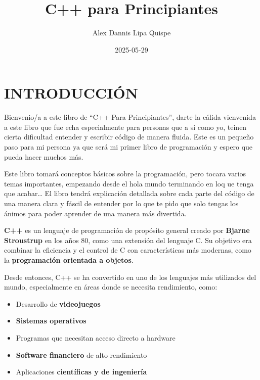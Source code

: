 \documentclass[
  11pt,
  a4paper,
  DIV=11,
  numbers=noendperiod]{scrreprt}
\title{C++ para Principiantes}
\author{Alex Dannis Lipa Quispe}
\date{2025-05-29}
\renewcommand*\contentsname{Table of contents}
\newcommand\contentsname{Table of contents}
\begin{document}
\maketitle

\renewcommand*\contentsname{Table of contents}
{
\hypersetup{linkcolor=}
\setcounter{tocdepth}{2}
\tableofcontents
}


\chapter{INTRODUCCIÓN}\label{introducciuxf3n}

Bienvenio/a a este libro de ``C++ Para Principiantes'', darte la cálida
vienvenida a este libro que fue echa especialmente para personas que a
si como yo, teinen cierta dificultad entender y escribir código de
manera fluida. Este es un pequeño paso para mi persona ya que será mi
primer libro de programación y espero que pueda hacer muchos más.

Este libro tomará conceptos básicos sobre la programación, pero tocara
varios temas importantes, empezando desde el hola mundo terminando en
loq ue tenga que acabar\ldots{} El libro tendrá explicación detallada
sobre cada parte del código de una manera clara y fáscil de entender por
lo que te pido que solo tengas los ánimos para poder aprender de una
manera más divertida.

\textbf{C++} es un lenguaje de programación de propósito general creado
por \textbf{Bjarne Stroustrup} en los años 80, como una extensión del
lenguaje C. Su objetivo era combinar la eficiencia y el control de C con
características más modernas, como la \textbf{programación orientada a
objetos}.

Desde entonces, C++ se ha convertido en uno de los lenguajes más
utilizados del mundo, especialmente en áreas donde se necesita
rendimiento, como:

\begin{itemize}
\item
  Desarrollo de \textbf{videojuegos}
\item
  \textbf{Sistemas operativos}
\item
  Programas que necesitan acceso directo a hardware
\item
  \textbf{Software financiero} de alto rendimiento
\item
  Aplicaciones \textbf{científicas y de ingeniería}
\end{itemize}
\end{document}
